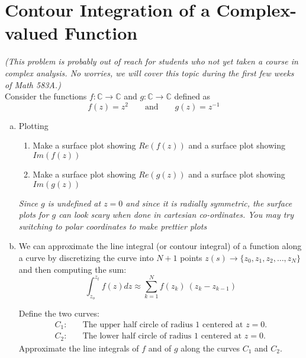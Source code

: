 \documentclass[11pt,oneside]{article}
\theoremstyle{definition}
\theoremstyle{definition}
\theoremstyle{remark}
\numberwithin{equation}{section}
\begin{document}
\newpage

\section{Contour Integration of a Complex-valued Function}
\textit{(This problem is probably out of reach for students who not yet taken a course in complex analysis. No worries, we will cover this topic during the first few weeks of Math 583A.)}\\

\noindent Consider the functions $f:\mathbb{C} \to \mathbb{C}$ and $g:\mathbb{C} \to \mathbb{C}$ defined as
\begin{equation*}
f(z) = z^2 \quad \quad \text{and} \quad \quad g(z) = z^{-1}
\end{equation*}
\begin{enumerate}[(a)]
    \item Plotting
    \begin{enumerate}
        \item Make a surface plot showing $Re(f(z))$ and a surface plot showing $Im(f(z))$
        \item Make a surface plot showing $Re(g(z))$ and a surface plot showing $Im(g(z))$
    \end{enumerate}
    \textit{Since $g$ is undefined at $z = 0$ and since it is radially symmetric, the surface plots for $g$ can look scary when done in cartesian co-ordinates. You may try switching to polar coordinates to make prettier plots}
    \item     We can approximate the line integral (or contour integral) of a function along a curve by discretizing the curve into $N+1$ points $z(s) \to \{z_0, z_1, z_2, \dots, z_N\}$ and then computing the sum:
    \begin{equation*}
    \int_{z_o}^{z_t} f(z) dz \approx \sum_{k = 1}^{N} f(z_k) \ (z_{k} - z_{k-1})
    \end{equation*}
    \begin{minipage}{.7\textwidth}
    Define the two curves:
    \begin{align*}
    C_1:&  \quad \text{The upper half circle of radius 1 centered at $z=0$.}\\
    C_2:&  \quad \text{The lower half circle of radius 1 centered at $z=0$.}
    \end{align*}
    Approximate the line integrals of $f$ and of $g$ along the curves $C_1$ and $C_2$.
    \end{minipage}
    \begin{minipage}{.29\textwidth}

\end{minipage}
\end{enumerate}
\end{document}
